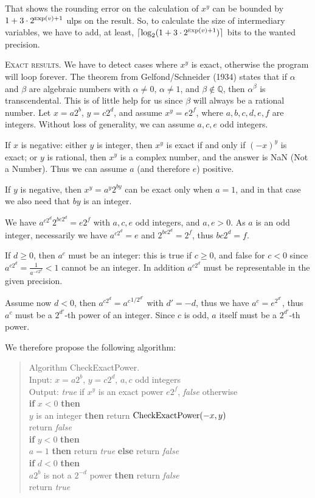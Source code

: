 \documentclass[12pt]{amsart}
\def\q{\hspace*{5mm}}
\def\Exp{{\rm \textsc exp}}
\def\Q{{\mathbb Q}}
\begin{document}
That shows the rounding error on the calculation of $x^y$
can be bounded by $1 + 3 \cdot 2^{\Exp(v)+1}$ ulps on the result. So,
to calculate the size of intermediary variables, we have to add, at
least, $\lceil \log_2 (1+3 \cdot 2^{\Exp(v)+1}) \rceil$ bits to the wanted
precision.

\noindent
\textsc{Exact results.}
We have to detect cases where $x^y$ is exact, otherwise the program will
loop forever.
The theorem from Gelfond/Schneider (1934) states that if $\alpha$ and
$\beta$ are algebraic numbers with $\alpha \neq 0$, $\alpha \neq 1$,
and $\beta \notin \Q$, then $\alpha^{\beta}$ is transcendental.
This is of little help for us since $\beta$ will always be a rational
number.
Let $x = a 2^b$, $y = c 2^d$, and assume $x^y = e 2^f$, where
$a, b, c, d, e, f$ are integers.
Without loss of generality, we can assume $a, c, e$ odd integers.

If $x$ is negative: either $y$ is integer, then $x^y$ is exact if and only if
$(-x)^y$ is exact; or $y$ is rational, then $x^y$ is a complex number,
and the answer is NaN (Not a Number).
Thus we can assume $a$ (and therefore $e$) positive.

If $y$ is negative, then $x^y = a^y 2^{b y}$ can be exact only when
$a=1$, and in that case we also need that $b y$ is an integer.

We have $a^{c 2^d} 2^{b c 2^d} = e 2^f$ with $a, c, e$ odd integers,
and $a, e > 0$.
As $a$ is an odd integer, necessarily we have $a^{c 2^d} = e$
and $2^{b c 2^d} = 2^f$, thus $b c 2^d = f$.

If $d \geq 0$, then $a^c$ must be an integer: this is true if $c \geq 0$,
and false for $c < 0$ since $a^{c 2^d} = \frac{1}{a^{-c 2^d}} < 1$ cannot be an
integer. In addition $a^{c 2^d}$ must be representable in the given precision.

Assume now $d < 0$,
then $a^{c 2^d} = {a^c}^{1/2^{d'}}$ with $d'=-d$, thus
we have $a^c = e^{2^{d'}}$, thus $a^c$ must be a $2^{d'}$-th power
of an integer.
Since $c$ is odd, $a$ itself must be a $2^{d'}$-th power.

We therefore propose the following algorithm:
\begin{quote}
Algorithm CheckExactPower. \\
Input: $x=a 2^b$, $y=c 2^d$, $a, c$ odd integers \\
Output: \emph{true} if $x^y$ is an exact power $e 2^f$, \emph{false} otherwise\\
{\bf if} $x < 0$ {\bf then} \\
\q {\bf if} $y$ is an integer {\bf then} return ${\rm CheckExactPower}(-x,y)$\\
\q {\bf else} return \emph{false} \\
{\bf if} $y < 0$ {\bf then} \\
\q {\bf if} $a=1$ {\bf then} return \emph{true} {\bf else} return \emph{false}\\
{\bf if} $d < 0$ {\bf then} \\
\q {\bf if} $a 2^b$ is not a $2^{-d}$ power {\bf then} return \emph{false} \\
return \emph{true}
\end{quote}
\end{document}

